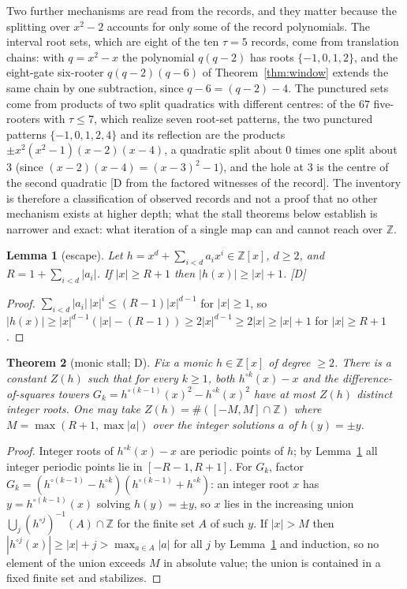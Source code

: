 \documentclass[11pt]{article}
\newtheorem{theorem}{Theorem}[section]
\newtheorem{lemma}[theorem]{Lemma}
\theoremstyle{definition}
\theoremstyle{remark}
\newcommand{\Z}{\mathbb{Z}}
\begin{document}
Two further mechanisms are read from the records, and they matter because the splitting over
$x^2 - 2$ accounts for only some of the record polynomials. The interval root sets, which are
eight of the ten $\tau = 5$ records, come from translation chains: with $q = x^2 - x$ the
polynomial $q(q-2)$ has roots $\{-1,0,1,2\}$, and the eight-gate six-rooter
$q(q-2)(q-6)$ of Theorem~\ref{thm:window} extends the same chain by one subtraction, since
$q - 6 = (q-2) - 4$. The punctured sets come from products of two split quadratics with different
centres: of the $67$ five-rooters with $\tau \le 7$, which realize seven root-set patterns, the two
punctured patterns $\{-1,0,1,2,4\}$ and its reflection are the products
$\pm x^2(x^2-1)(x-2)(x-4)$, a quadratic split about $0$ times one split about $3$ (since
$(x-2)(x-4) = (x-3)^2 - 1$), and the hole at $3$ is the centre of the second quadratic
[D from the factored witnesses of the record]. The inventory is therefore a classification of
observed records and not a proof that no other mechanism exists at higher depth; what the stall
theorems below establish is narrower and exact: what iteration of a single map can and cannot
reach over $\Z$.


\begin{lemma}[escape]\label{lem:escape}
Let $h = x^d + \sum_{i<d} a_i x^i \in \Z[x]$, $d \ge 2$, and
$R = 1 + \sum_{i<d} |a_i|$. If $|x| \ge R + 1$ then $|h(x)| \ge |x| + 1$. \emph{[D]}
\end{lemma}
\begin{proof}
$\sum_{i<d} |a_i|\,|x|^i \le (R-1)|x|^{d-1}$ for $|x| \ge 1$, so
$|h(x)| \ge |x|^{d-1}(|x| - (R-1)) \ge 2|x|^{d-1} \ge 2|x| \ge |x| + 1$ for
$|x| \ge R + 1$.
\end{proof}

\begin{theorem}[monic stall; D]\label{thm:stall}
Fix a monic $h \in \Z[x]$ of degree $\ge 2$. There is a constant $Z(h)$ such that
for every $k \ge 1$, both $h^{\circ k}(x) - x$ and the difference-of-squares towers
$G_k = h^{\circ (k-1)}(x)^2 - h^{\circ k}(x)^2$ have at most $Z(h)$ distinct integer
roots. One may take $Z(h) = \#([-M, M] \cap \Z)$ where
$M = \max(R+1, \max |a|)$ over the integer solutions $a$ of $h(y) = \pm y$.
\end{theorem}
\begin{proof}
Integer roots of $h^{\circ k}(x) - x$ are periodic points of $h$; by
Lemma~\ref{lem:escape} all integer periodic points lie in $[-R-1, R+1]$. For $G_k$,
factor $G_k = (h^{\circ(k-1)} - h^{\circ k})(h^{\circ(k-1)} + h^{\circ k})$: an
integer root $x$ has $y = h^{\circ(k-1)}(x)$ solving $h(y) = \pm y$, so $x$ lies in
the increasing union $\bigcup_j (h^{\circ j})^{-1}(A) \cap \Z$ for the finite set $A$
of such $y$. If $|x| > M$ then $|h^{\circ j}(x)| \ge |x| + j > \max_{a \in A} |a|$
for all $j$ by Lemma~\ref{lem:escape} and induction, so no element of the union
exceeds $M$ in absolute value; the union is contained in a fixed finite set and
stabilizes.
\end{proof}
\end{document}
